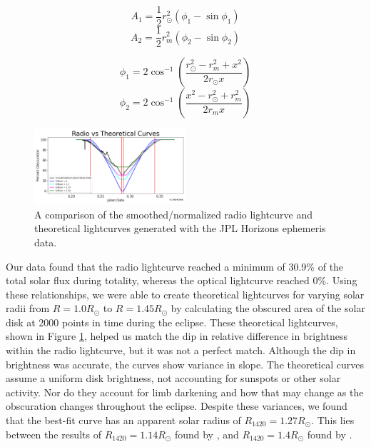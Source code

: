 \begin{equation}
  A_1 = \frac{1}{2}r_{\odot}^2\left(\phi_1 - \sin\phi_1\right)
\end{equation}
\begin{equation}
  A_2 = \frac{1}{2}r_{m}^2\left(\phi_2 - \sin\phi_2\right)
\end{equation}

\begin{equation}
  \phi_1 = 2\cos^{-1}\left(\frac{r_{\odot}^2 - r_{m}^2+x^2}{2r_{\odot}x}\right)
\end{equation}
\begin{equation}
  \phi_2 = 2\cos^{-1}\left(\frac{x^2 - r_{\odot}^2 + r_{m}^2}{2r_{m}x}\right)
\end{equation}


\begin{figure}
  \includegraphics[width=0.5\textwidth]{figures/RadiovsTheoretical.png}
  \caption{\label{fig:RadiovsTheoretical} A comparison of the smoothed/normalized radio lightcurve and theoretical lightcurves generated with the JPL Horizons ephemeris data.}
\end{figure}
Our data found that the radio lightcurve reached a minimum of 30.9\% of the total solar flux during totality, whereas the optical lightcurve reached 0\%.
Using these relationships, we were able to create theoretical lightcurves for varying solar radii from $R = 1.0 R_{\odot}$ to $R = 1.45 R_{\odot}$ by calculating the obscured area of the solar disk at 2000 points in time during the eclipse.
These theoretical lightcurves, shown in Figure \ref{fig:RadiovsTheoretical}, helped us match the dip in relative difference in brightness within the radio lightcurve, but it was not a perfect match.
Although the dip in brightness was accurate, the curves show variance in slope.
The theoretical curves assume a uniform disk brightness, not accounting for sunspots or other solar activity.
Nor do they account for limb darkening and how that may change as the obscuration changes throughout the eclipse.
Despite these variances, we found that the best-fit curve has an apparent solar radius of $R_{\mathrm{1420}} = 1.27 R_{\odot}$.
This lies between the results of $R_{\mathrm{1420}} = 1.14 R_{\odot}$ found by \cite{messerotti_radio_2000}, and $R_{\mathrm{1420}} = 1.4 R_{\odot}$ found by \cite{leung_solar_2022}.